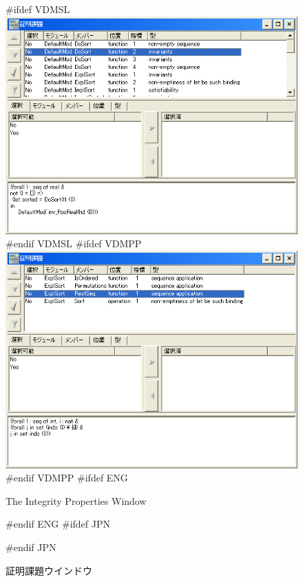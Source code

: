 \documentclass[\pformat,12pt]{article}
\begin{document}
\begin{figure}[tbh]
\begin{center}
#ifdef VDMSL
\includegraphics[width=12.5cm]{integWin-sl.png}
#endif VDMSL
#ifdef VDMPP
\includegraphics[width=12.5cm]{integWin-pp.png}
#endif VDMPP
#ifdef ENG
\caption{The Integrity Properties Window}
#endif ENG
#ifdef JPN
\caption{証明課題ウインドウ}
#endif JPN
\label{fig:integWin}
\end{center}
\end{figure}
\end{document}
